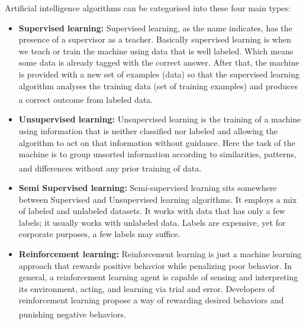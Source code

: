 Artificial intelligence algorithms can be categorised into these four main types:

\begin{itemize}
    \item \textbf{Supervised learning:}
        Supervised learning, as the name indicates, has the presence of a supervisor as a teacher. Basically supervised learning is when we teach or train the machine using data that is well labeled. Which means some data is already tagged with the correct answer. After that, the machine is provided with a new set of examples (data) so that the supervised learning algorithm analyses the training data (set of training examples) and produces a correct outcome from labeled data. \textsuperscript{\cite{AITypes-GeeksForGeeks}}

    \item \textbf{Unsupervised learning:}
        Unsupervised learning is the training of a machine using information that is neither classified nor labeled and allowing the algorithm to act on that information without guidance. Here the task of the machine is to group unsorted information according to similarities, patterns, and differences without any prior training of data. \textsuperscript{\cite{AITypes-GeeksForGeeks}}

    \vspace{0.2in}

    

    \item \textbf{Semi Supervised learning:}
        Semi-supervised learning sits somewhere between Supervised and Unsupervised learning algorithms. It employs a mix of labeled and unlabeled datasets. It works with data that has only a few labels; it usually works with unlabeled data. Labels are expensive, yet for corporate purposes, a few labels may suffice.
    \item \textbf{Reinforcement learning:}
        Reinforcement learning is just a machine learning approach that rewards positive behavior while penalizing poor behavior. In general, a reinforcement learning agent is capable of sensing and interpreting its environment, acting, and learning via trial and error. Developers of reinforcement learning propose a way of rewarding desired behaviors and punishing negative behaviors. \textsuperscript{\cite{SSLvsRL-askanydifference}}

    \vspace{0.2in}

    
\end{itemize}

